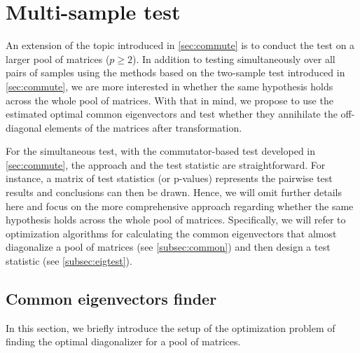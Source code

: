\documentclass[12pt]{article}
\numberwithin{thm}{section}
\numberwithin{defn}{section}
\numberwithin{lem}{section}
\numberwithin{prop}{section}
\numberwithin{cor}{section}
\numberwithin{rem}{section}
\begin{document}
\vspace{-0.5cm}
\section{Multi-sample test}\label{sec:multi}
\vspace{-0.3cm}
An extension of the topic introduced in \autoref{sec:commute} is to conduct the test on a larger pool of matrices ($p \ge 2$). %
%
In addition to testing simultaneously over all pairs of samples using the methods based on the two-sample test introduced in \autoref{sec:commute}, we are more interested in whether the same hypothesis holds across the whole pool of matrices. With that in mind, we propose to use the estimated optimal common eigenvectors and test whether they annihilate the off-diagonal elements of the matrices after transformation.

For the simultaneous test, with the commutator-based test developed in \autoref{sec:commute}, the approach and the test statistic are straightforward. For instance, a matrix of test statistics (or p-values) represents the pairwise test results and conclusions can then be drawn. Hence, we will omit further details here and focus on the more comprehensive approach regarding whether the same hypothesis holds across the whole pool of matrices. Specifically, we will refer to optimization algorithms for calculating the common eigenvectors that almost diagonalize a pool of matrices (see \autoref{subsec:common}) and then design a test statistic (see \autoref{subsec:eigtest}).

\vspace{-0.5cm}
\subsection{Common eigenvectors finder}\label{subsec:common}
\vspace{-0.3cm}
In this section, we briefly introduce the setup of the optimization problem of finding the optimal diagonalizer for a pool of matrices.%
\end{document}
